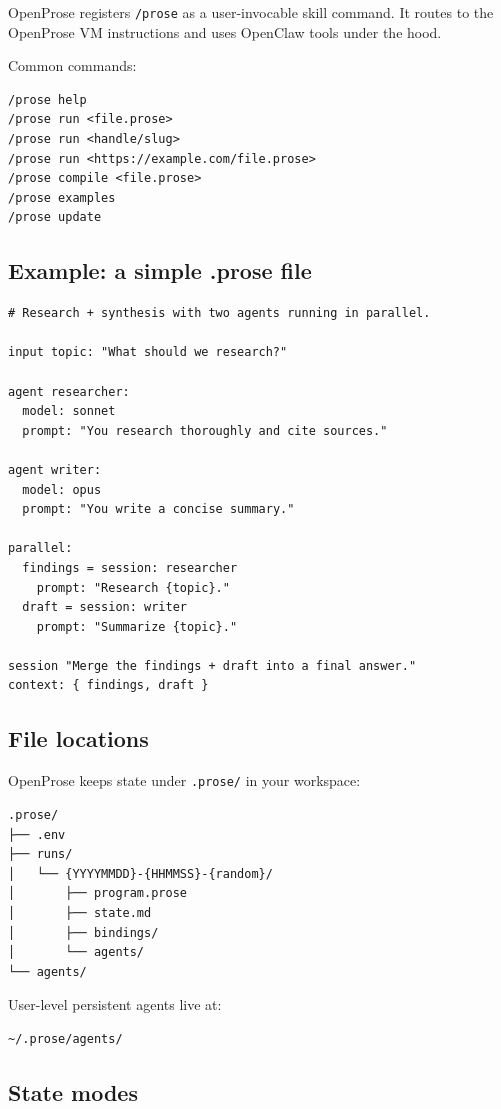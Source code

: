 OpenProse registers \texttt{/prose} as a user-invocable skill command. It routes to the OpenProse VM instructions and uses OpenClaw tools under the hood.

Common commands:

\begin{lstlisting}
/prose help
/prose run <file.prose>
/prose run <handle/slug>
/prose run <https://example.com/file.prose>
/prose compile <file.prose>
/prose examples
/prose update
\end{lstlisting}


\subsection{Example: a simple .prose file}


\begin{lstlisting}
# Research + synthesis with two agents running in parallel.

input topic: "What should we research?"

agent researcher:
  model: sonnet
  prompt: "You research thoroughly and cite sources."

agent writer:
  model: opus
  prompt: "You write a concise summary."

parallel:
  findings = session: researcher
    prompt: "Research {topic}."
  draft = session: writer
    prompt: "Summarize {topic}."

session "Merge the findings + draft into a final answer."
context: { findings, draft }
\end{lstlisting}


\subsection{File locations}


OpenProse keeps state under \texttt{.prose/} in your workspace:

\begin{lstlisting}
.prose/
├── .env
├── runs/
│   └── {YYYYMMDD}-{HHMMSS}-{random}/
│       ├── program.prose
│       ├── state.md
│       ├── bindings/
│       └── agents/
└── agents/
\end{lstlisting}


User-level persistent agents live at:

\begin{lstlisting}
~/.prose/agents/
\end{lstlisting}


\subsection{State modes}


